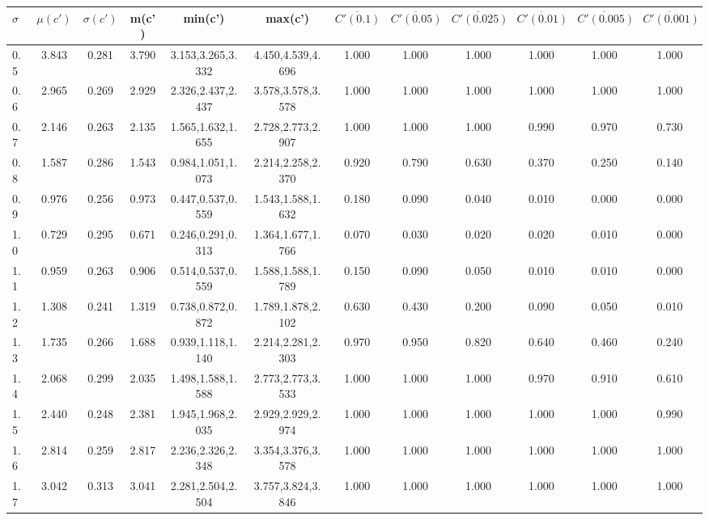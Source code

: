 \begin{table*}[t]
\begin{center}
\begin{tabular}{| l | c | c | c | c | c | c | c | c | c | c | c |}\hline
$\sigma$ & $\mu(c')$ & $\sigma(c')$ & m(c') & min(c') & max(c') & $\overline{C'(0.1)}$ & $\overline{C'(0.05)}$ & $\overline{C'(0.025)}$ & $\overline{C'(0.01)}$ & $\overline{C'(0.005)}$ & $\overline{C'(0.001)}$ \\\hline
0.5 & 3.843 & 0.281 & 3.790 & 3.153,3.265,3.332 & 4.450,4.539,4.696  & 1.000  & 1.000  & 1.000  & 1.000  & 1.000  & 1.000 \\\hline
0.6 & 2.965 & 0.269 & 2.929 & 2.326,2.437,2.437 & 3.578,3.578,3.578  & 1.000  & 1.000  & 1.000  & 1.000  & 1.000  & 1.000 \\\hline
0.7 & 2.146 & 0.263 & 2.135 & 1.565,1.632,1.655 & 2.728,2.773,2.907  & 1.000  & 1.000  & 1.000  & 0.990  & 0.970  & 0.730 \\\hline
0.8 & 1.587 & 0.286 & 1.543 & 0.984,1.051,1.073 & 2.214,2.258,2.370  & 0.920  & 0.790  & 0.630  & 0.370  & 0.250  & 0.140 \\\hline
0.9 & 0.976 & 0.256 & 0.973 & 0.447,0.537,0.559 & 1.543,1.588,1.632  & 0.180  & 0.090  & 0.040  & 0.010  & 0.000  & 0.000 \\\hline
1.0 & 0.729 & 0.295 & 0.671 & 0.246,0.291,0.313 & 1.364,1.677,1.766  & 0.070  & 0.030  & 0.020  & 0.020  & 0.010  & 0.000 \\\hline
1.1 & 0.959 & 0.263 & 0.906 & 0.514,0.537,0.559 & 1.588,1.588,1.789  & 0.150  & 0.090  & 0.050  & 0.010  & 0.010  & 0.000 \\\hline
1.2 & 1.308 & 0.241 & 1.319 & 0.738,0.872,0.872 & 1.789,1.878,2.102  & 0.630  & 0.430  & 0.200  & 0.090  & 0.050  & 0.010 \\\hline
1.3 & 1.735 & 0.266 & 1.688 & 0.939,1.118,1.140 & 2.214,2.281,2.303  & 0.970  & 0.950  & 0.820  & 0.640  & 0.460  & 0.240 \\\hline
1.4 & 2.068 & 0.299 & 2.035 & 1.498,1.588,1.588 & 2.773,2.773,3.533  & 1.000  & 1.000  & 1.000  & 0.970  & 0.910  & 0.610 \\\hline
1.5 & 2.440 & 0.248 & 2.381 & 1.945,1.968,2.035 & 2.929,2.929,2.974  & 1.000  & 1.000  & 1.000  & 1.000  & 1.000  & 0.990 \\\hline
1.6 & 2.814 & 0.259 & 2.817 & 2.236,2.326,2.348 & 3.354,3.376,3.578  & 1.000  & 1.000  & 1.000  & 1.000  & 1.000  & 1.000 \\\hline
1.7 & 3.042 & 0.313 & 3.041 & 2.281,2.504,2.504 & 3.757,3.824,3.846  & 1.000  & 1.000  & 1.000  & 1.000  & 1.000  & 1.000 \\\hline

\end{tabular}
\end{center}
\end{table*}

